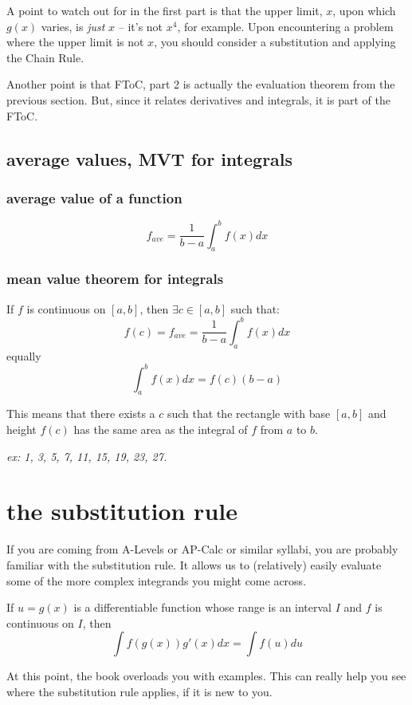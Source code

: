 \documentclass[10pt,a4paper]{report}
\begin{document}
A point to watch out for in the first part is that the upper limit, $x$, upon which $g(x)$ varies, is \emph{just} $x$ -- it's not $x^4$, for example. Upon encountering a problem where the upper limit is not $x$, you should consider a substitution and applying the Chain Rule.

Another point is that FToC, part 2 is actually the evaluation theorem from the previous section. But, since it relates derivatives and integrals, it is part of the FToC.

\subsection{average values, MVT for integrals}

\subsubsection{average value of a function}

$$
	f_{ave} = \frac{1}{b - a} \int_a^b f(x)dx
$$

\subsubsection{mean value theorem for integrals}

If $f$ is continuous on $[a, b]$, then $\exists c \in [a, b]$ such that:
$$
	f(c) = f_{ave} = \frac{1}{b - a} \int_a^b f(x)dx
$$
equally
$$
	\int_a^b f(x) dx = f(c) (b - a)
$$

This means that there exists a $c$ such that the rectangle with base $[a, b]$ and height $f(c)$ has the same area as the integral of $f$ from $a$ to $b$.

\emph{ex: 1, 3, 5, 7, 11, 15, 19, 23, 27.}

\section{the substitution rule}

If you are coming from A-Levels or AP-Calc or similar syllabi, you are probably familiar with the substitution rule. It allows us to (relatively) easily evaluate some of the more complex integrands you might come across.

If $u = g(x)$ is a differentiable function whose range is an interval $I$ and $f$ is continuous on $I$, then
$$
	\int f(g(x))g'(x) dx = \int f(u) du
$$

At this point, the book overloads you with examples. This can really help you see where the substitution rule applies, if it is new to you.
\end{document}
